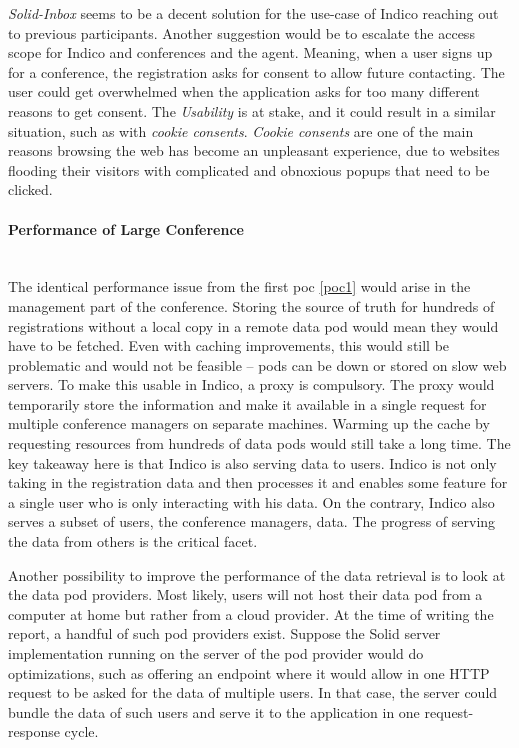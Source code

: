 \textit{Solid-Inbox} seems to be a decent solution for the use-case of Indico reaching out to previous participants. Another suggestion would be to escalate the access scope for Indico and conferences and the agent. Meaning, when a user signs up for a conference, the registration asks for consent to allow future contacting. The user could get overwhelmed when the application asks for too many different reasons to get consent. The \textit{Usability} is at stake, and it could result in a similar situation, such as with \textit{cookie consents}. \textit{Cookie consents} are one of the main reasons browsing the web has become an unpleasant experience, due to websites flooding their visitors with complicated and obnoxious popups that need to be clicked.
\vspace{0.5cm}
\paragraph{Performance of Large Conference}\mbox{}\\

The identical performance issue from the first \gls{poc} \ref{poc1} would arise in the management part of the conference. Storing the source of truth for hundreds of registrations without a local copy in a remote data pod would mean they would have to be fetched. Even with caching improvements, this would still be problematic and would not be feasible -- pods can be down or stored on slow web servers. To make this usable in Indico, a proxy is compulsory. The proxy would temporarily store the information and make it available in a single request for multiple conference managers on separate machines. Warming up the cache by requesting resources from hundreds of data pods would still take a long time. The key takeaway here is that Indico is also serving data to users. Indico is not only taking in the registration data and then processes it and enables some feature for a single user who is only interacting with his data. On the contrary, Indico also serves a subset of users, the conference managers, data. The progress of serving the data from others is the critical facet.

Another possibility to improve the performance of the data retrieval is to look at the data pod providers. Most likely, users will not host their data pod from a computer at home but rather from a cloud provider. At the time of writing the report, a handful of such pod providers exist. Suppose the Solid server implementation running on the server of the pod provider would do optimizations, such as offering an endpoint where it would allow in one HTTP request to be asked for the data of multiple users. In that case, the server could bundle the data of such users and serve it to the application in one request-response cycle.
\vspace{0.5cm}
